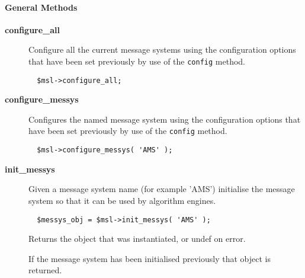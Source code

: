 \paragraph*{General Methods\label{ORAC::Msg::MessysLaunch_General_Methods}}\begin{description}
\item[\textbf{configure\_all}] \mbox{}

Configure all the current message systems using the configuration
options that have been set previously by use of the \texttt{config}
method.

\begin{verbatim}
  $msl->configure_all;
\end{verbatim}
\item[\textbf{configure\_messys}] \mbox{}

Configures the named message system using the configuration
options that have been set previously by use of the \texttt{config}
method.

\begin{verbatim}
  $msl->configure_messys( 'AMS' );
\end{verbatim}
\item[\textbf{init\_messys}] \mbox{}

Given a message system name (for example 'AMS') initialise the
message system so that it can be used by algorithm engines.

\begin{verbatim}
  $messys_obj = $msl->init_messys( 'AMS' );
\end{verbatim}


Returns the object that was instantiated, or undef on error.



If the message system has been initialised previously that
object is returned.

\end{description}

